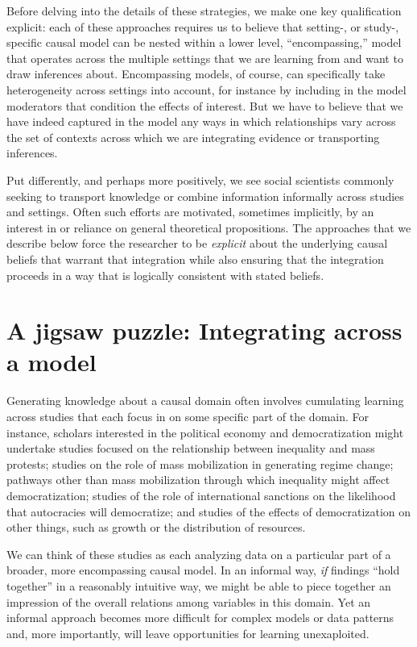\documentclass[
  12pt,
]{book}
\begin{document}
Before delving into the details of these strategies, we make one key qualification explicit: each of these approaches requires us to believe that setting-, or study-, specific causal model can be nested within a lower level, ``encompassing,'' model that operates across the multiple settings that we are learning from and want to draw inferences about. Encompassing models, of course, can specifically take heterogeneity across settings into account, for instance by including in the model moderators that condition the effects of interest. But we have to believe that we have indeed captured in the model any ways in which relationships vary across the set of contexts across which we are integrating evidence or transporting inferences.

Put differently, and perhaps more positively, we see social scientists commonly seeking to transport knowledge or combine information informally across studies and settings. Often such efforts are motivated, sometimes implicitly, by an interest in or reliance on general theoretical propositions. The approaches that we describe below force the researcher to be \emph{explicit} about the underlying causal beliefs that warrant that integration while also ensuring that the integration proceeds in a way that is logically consistent with stated beliefs.

\hypertarget{a-jigsaw-puzzle-integrating-across-a-model}{%
\section{A jigsaw puzzle: Integrating across a model}\label{a-jigsaw-puzzle-integrating-across-a-model}}

Generating knowledge about a causal domain often involves cumulating learning across studies that each focus in on some specific part of the domain. For instance, scholars interested in the political economy and democratization might undertake studies focused on the relationship between inequality and mass protests; studies on the role of mass mobilization in generating regime change; pathways other than mass mobilization through which inequality might affect democratization; studies of the role of international sanctions on the likelihood that autocracies will democratize; and studies of the effects of democratization on other things, such as growth or the distribution of resources.

We can think of these studies as each analyzing data on a particular part of a broader, more encompassing causal model. In an informal way, \emph{if} findings ``hold together'' in a reasonably intuitive way, we might be able to piece together an impression of the overall relations among variables in this domain. Yet an informal approach becomes more difficult for complex models or data patterns and, more importantly, will leave opportunities for learning unexaploited.
\end{document}
